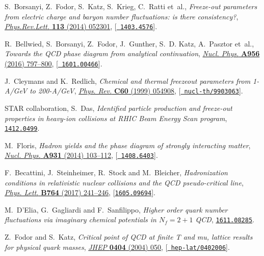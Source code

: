 \documentclass{PoS}
\begin{document}
\begin{thebibliography}{100}
S.~Borsanyi, Z.~Fodor, S.~Katz, S.~Krieg, C.~Ratti et~al., \emph{{Freeze-out
  parameters from electric charge and baryon number fluctuations: is there
  consistency?}},
  \href{http://dx.doi.org/10.1103/PhysRevLett.113.052301}{\emph{Phys.Rev.Lett.}
  {\bf 113} (2014) 052301}, [\href{https://arxiv.org/abs/1403.4576}{{\tt
  1403.4576}}].

R.~Bellwied, S.~Borsanyi, Z.~Fodor, J.~Gunther, S.~D. Katz, A.~Pasztor et~al.,
  \emph{{Towards the QCD phase diagram from analytical continuation}},
  \href{http://dx.doi.org/10.1016/j.nuclphysa.2016.02.010}{\emph{Nucl. Phys.}
  {\bf A956} (2016) 797--800}, [\href{https://arxiv.org/abs/1601.00466}{{\tt
  1601.00466}}].

J.~Cleymans and K.~Redlich, \emph{{Chemical and thermal freezeout parameters
  from 1-A/GeV to 200-A/GeV}},
  \href{http://dx.doi.org/10.1103/PhysRevC.60.054908}{\emph{Phys. Rev.} {\bf
  C60} (1999) 054908}, [\href{https://arxiv.org/abs/nucl-th/9903063}{{\tt
  nucl-th/9903063}}].

{\scshape STAR} collaboration, S.~Das, \emph{{Identified particle production
  and freeze-out properties in heavy-ion collisions at RHIC Beam Energy Scan
  program}},  \href{https://arxiv.org/abs/1412.0499}{{\tt 1412.0499}}.

M.~Floris, \emph{{Hadron yields and the phase diagram of strongly interacting
  matter}},
  \href{http://dx.doi.org/10.1016/j.nuclphysa.2014.09.002}{\emph{Nucl. Phys.}
  {\bf A931} (2014) 103--112}, [\href{https://arxiv.org/abs/1408.6403}{{\tt
  1408.6403}}].

F.~Becattini, J.~Steinheimer, R.~Stock and M.~Bleicher, \emph{{Hadronization
  conditions in relativistic nuclear collisions and the QCD pseudo-critical
  line}}, \href{http://dx.doi.org/10.1016/j.physletb.2016.11.033}{\emph{Phys.
  Lett.} {\bf B764} (2017) 241--246},
  [\href{https://arxiv.org/abs/1605.09694}{{\tt 1605.09694}}].

M.~D'Elia, G.~Gagliardi and F.~Sanfilippo, \emph{{Higher order quark number
  fluctuations via imaginary chemical potentials in $N_f=2+1$ QCD}},
  \href{https://arxiv.org/abs/1611.08285}{{\tt 1611.08285}}.

Z.~Fodor and S.~Katz, \emph{{Critical point of QCD at finite T and mu, lattice
  results for physical quark masses}},
  \href{http://dx.doi.org/10.1088/1126-6708/2004/04/050}{\emph{JHEP} {\bf 0404}
  (2004) 050}, [\href{https://arxiv.org/abs/hep-lat/0402006}{{\tt
  hep-lat/0402006}}].


\end{thebibliography}
\end{document}
